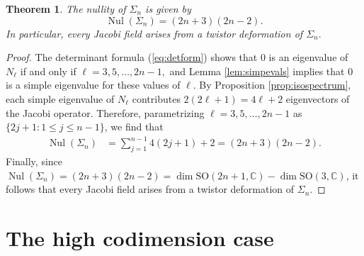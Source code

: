 \documentclass[11pt]{article}
\newcommand{\SO}{\mathrm{SO}}
\newcommand{\C}{\mathbb{C}}
\newtheorem{thm}{Theorem}[section]
\theoremstyle{definition}
\numberwithin{equation}{section}
\begin{document}
\begin{thm} \label{thm:NullityResult}
    The nullity of $\Sigma_n$ is given by
    \begin{equation*}
        \operatorname{Nul}(\Sigma_n) = \left(2n+3 \right) \left(2n-2 \right)\!.
    \end{equation*}
    In particular, every Jacobi field arises from a twistor deformation of $\Sigma_n.$
\end{thm}

\begin{proof}
The determinant formula (\ref{eq:detform}) shows that $0$ is an eigenvalue of $N_\ell$ if and only if $\ell = 3, 5, \ldots, 2n-1,$ and Lemma \ref{lem:simpevals} implies that $0$ is a simple eigenvalue for these values of $\ell$.  By Proposition \ref{prop:isospectrum}, each simple eigenvalue of $N_\ell$ contributes $2(2\ell + 1) = 4\ell + 2$ eigenvectors of the Jacobi operator.  Therefore, parametrizing $\ell = 3, 5, \ldots, 2n-1$ as $\{2j+1 \colon 1 \leq j \leq n-1\}$, we find that 
    \begin{equation*}
        \begin{aligned}
             \operatorname{Nul}(\Sigma_n) &=  \sum_{j=1}^{n-1}  4(2j+1) + 2 = (2n+3)(2n-2).
        \end{aligned}
    \end{equation*}
Finally, since $\operatorname{Nul}(\Sigma_n) = (2n+3)(2n-2) = \dim \SO(2n+1, \C) - \dim \SO(3, \C)$, it follows that every Jacobi field arises from a twistor deformation of $\Sigma_n$.
\end{proof}



\section{The high codimension case}  \label{sec:HighCodim}
\end{document}
